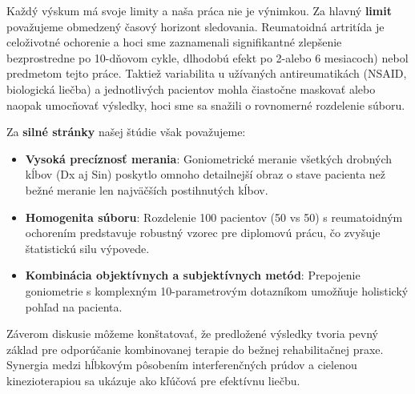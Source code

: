 Každý výskum má svoje limity a naša práca nie je výnimkou. Za hlavný \textbf{limit} považujeme obmedzený časový horizont sledovania. Reumatoidná artritída je celoživotné ochorenie a hoci sme zaznamenali signifikantné zlepšenie bezprostredne po 10-dňovom cykle, dlhodobú efekt p​o 2-alebo 6 mesiacoch) nebol predmetom tejto práce. Taktiež variabilita u užívaných antireumatikách (NSAID, biologická liečba) a jednotlivých pacientov mohla čiastočne maskovať alebo naopak umocňovať výsledky, hoci sme sa snažili o rovnomerné rozdelenie súboru.

Za \textbf{silné stránky} našej štúdie však považujeme:

\begin{itemize}
    \item \textbf{Vysoká precíznosť merania}: Goniometrické meranie všetkých drobných kĺbov (Dx aj Sin) poskytlo omnoho detailnej​ší obraz o stave pacienta než bežné meranie len najväčších postihnutých kĺbov.
    
    \item \textbf{Homogenita súboru}: Rozdelenie 100 pacientov (50 vs 50) s reumatoidným ochorením predstavuje robustný vzorec pre diplomovú prácu, čo zvyšuje štatistickú silu výpovede.
    
    \item \textbf{Kombinácia objektívnych a subjektívnych metód}: Prepojenie goniometrie s komplexným 10-parametrovým dotazníkom umožňuje holistický pohľad na pacienta.
\end{itemize}

Záverom diskusie môžeme konštatovať, že predložené výsledky tvoria pevný základ pre odporúčanie kombinovanej terapie do bežnej rehabilitačnej praxe. Synergia medzi hĺbkovým pôsobením interferenčných prúdov a cielenou kinezioterapiou sa ukázuje ako kľúčová pre efektívnu liečbu.


